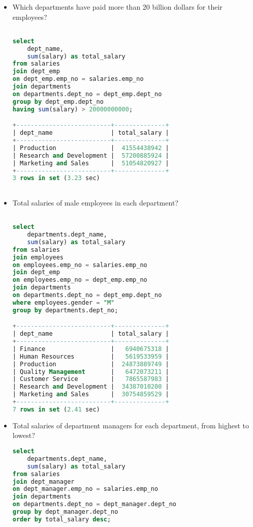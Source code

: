 \documentclass[12pt]{article}
\begin{document}
\begin{itemize}
\begin{lstlisting}[language=SQL]
\end{lstlisting}


\item Which departments have paid more than 20 billion dollars for their employees?
\begin{lstlisting}[language=SQL]

select  
	dept_name,
	sum(salary) as total_salary
from salaries
join dept_emp
on dept_emp.emp_no = salaries.emp_no
join departments
on departments.dept_no = dept_emp.dept_no
group by dept_emp.dept_no
having sum(salary) > 20000000000;

+--------------------------+--------------+
| dept_name                | total_salary |
+--------------------------+--------------+
| Production               |  41554438942 |
| Research and Development |  57200885924 |
| Marketing and Sales      |  51054820927 |
+--------------------------+--------------+
3 rows in set (3.23 sec)



\end{lstlisting}


\item Total salaries of male employees in each department?
\begin{lstlisting}[language=SQL]

select  
	departments.dept_name,
	sum(salary) as total_salary
from salaries
join employees
on employees.emp_no = salaries.emp_no 
join dept_emp
on employees.emp_no = dept_emp.emp_no 
join departments
on departments.dept_no = dept_emp.dept_no 
where employees.gender = "M"
group by departments.dept_no;

+--------------------------+--------------+
| dept_name                | total_salary |
+--------------------------+--------------+
| Finance                  |   6940675318 |
| Human Resources          |   5619533959 |
| Production               |  24873889749 |
| Quality Management       |   6472073211 |
| Customer Service         |   7865587983 |
| Research and Development |  34387010200 |
| Marketing and Sales      |  30754859529 |
+--------------------------+--------------+
7 rows in set (2.41 sec)


\end{lstlisting}


\item Total salaries of department managers for each department, from highest to lowest?
\begin{lstlisting}[language=SQL]
select  
	departments.dept_name,
	sum(salary) as total_salary
from salaries
join dept_manager
on dept_manager.emp_no = salaries.emp_no 
join departments
on departments.dept_no = dept_manager.dept_no
group by dept_manager.dept_no
order by total_salary desc;


\end{lstlisting}
\end{itemize}
\end{document}
